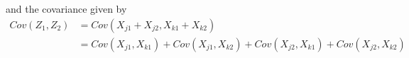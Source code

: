\documentclass{article}
\begin{document}
and the covariance given by
\begin{align*}
  Cov(Z_1, Z_2) & = Cov(X_{j1} + X_{j2}, X_{k1} + X_{k2}) \\
  & = Cov(X_{j1}, X_{k1}) + Cov(X_{j1}, X_{k2}) + Cov(X_{j2}, X_{k1}) + Cov(X_{j2}, X_{k2})
\end{align*}



\renewcommand*{\bibname}{References} %

\end{document}
